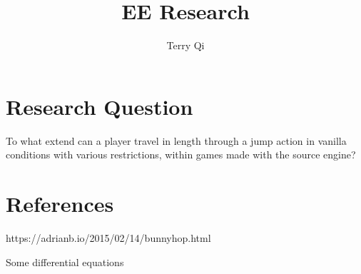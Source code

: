 \documentclass[a4paper,12pt]{article}
\title{EE Research}
\author{Terry Qi}
\begin{document}
\maketitle
\newpage

\section{Research Question}

To what extend can a player travel in length through a jump action in vanilla conditions with various restrictions, within games made with the source engine?

\section{References}

https://adrianb.io/2015/02/14/bunnyhop.html

Some differential equations
\end{document}

